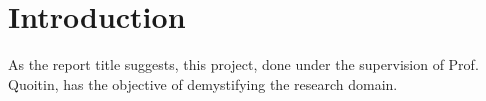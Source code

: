 \documentclass[conference]{IEEEtran} %
\begin{document}
%
%
%
%
%
%

\section{Introduction}\label{sec:intro} %
As the report title suggests, this project, done under the supervision of Prof. Quoitin, has the objective of demystifying the research domain.
\end{document}
